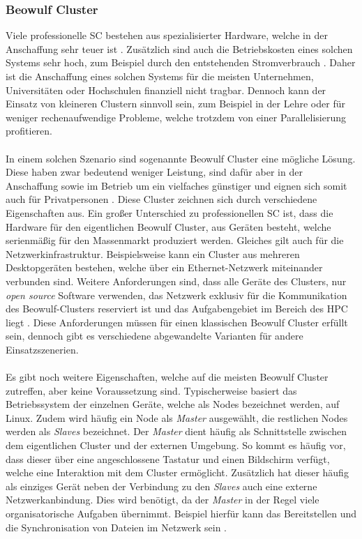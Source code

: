 \subsubsection{Beowulf Cluster}
Viele professionelle \ac{SC} bestehen aus spezialisierter Hardware, welche in der Anschaffung  sehr teuer ist \cite{brown2004engineering}. Zusätzlich sind auch die Betriebskosten eines solchen Systems sehr hoch, zum Beispiel durch den entstehenden Stromverbrauch \cite{nielsen2016introduction}. Daher ist die Anschaffung eines solchen Systems für die meisten Unternehmen, Universitäten oder Hochschulen finanziell nicht tragbar. Dennoch kann der Einsatz von kleineren Clustern sinnvoll sein, zum Beispiel in der Lehre oder für weniger rechenaufwendige Probleme, welche trotzdem von einer Parallelisierung profitieren. 
\\\\
In einem solchen Szenario sind sogenannte Beowulf Cluster eine mögliche Lösung. Diese haben zwar bedeutend weniger Leistung, sind dafür aber in der Anschaffung sowie im Betrieb um ein vielfaches günstiger und eignen sich somit auch für Privatpersonen \cite{adams2008microwulf}. Diese Cluster zeichnen sich durch verschiedene Eigenschaften aus. Ein großer Unterschied zu professionellen \ac{SC} ist, dass die Hardware für den eigentlichen Beowulf Cluster, aus Geräten besteht, welche serienmäßig für den Massenmarkt produziert werden. Gleiches gilt auch für die Netzwerkinfrastruktur. Beispielsweise kann ein Cluster aus mehreren Desktopgeräten bestehen, welche über ein Ethernet-Netzwerk miteinander verbunden sind. Weitere Anforderungen sind, dass alle Geräte des Clusters, nur \emph{open source} Software verwenden, das Netzwerk exklusiv für die Kommunikation des Beowulf-Clusters reserviert ist und das Aufgabengebiet im Bereich des \ac{HPC} liegt \cite{brown2004engineering}. Diese Anforderungen müssen für einen klassischen Beowulf Cluster erfüllt sein, dennoch gibt es verschiedene abgewandelte Varianten für andere Einsatzszenerien.
\\\\
Es gibt noch weitere Eigenschaften, welche auf die meisten Beowulf Cluster zutreffen, aber keine Voraussetzung sind. Typischerweise basiert das Betriebssystem der einzelnen Geräte, welche als Nodes bezeichnet werden, auf Linux. Zudem wird häufig ein Node als \emph{Master} ausgewählt,  die restlichen Nodes werden als \emph{Slaves} bezeichnet. Der \emph{Master} dient häufig als Schnittstelle zwischen dem eigentlichen Cluster und der externen Umgebung. So kommt es häufig vor, dass dieser über eine angeschlossene Tastatur und einen Bildschirm verfügt, welche eine Interaktion mit dem Cluster ermöglicht. Zusätzlich hat dieser häufig als einziges Gerät neben der Verbindung zu den \emph{Slaves} auch eine externe Netzwerkanbindung. Dies wird benötigt, da der \emph{Master} in der Regel viele organisatorische Aufgaben übernimmt. Beispiel hierfür kann das Bereitstellen und die Synchronisation von Dateien im Netzwerk sein \cite{brown2004engineering}.

